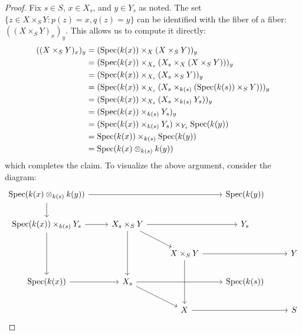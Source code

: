 \begin{proof}
	Fix $s \in S$, $x \in X_s$, and $y \in Y_s$ as noted. The set $\{ z \in X \times_S Y : p(z) = x, q(z) = y\}$ can be identified with the fiber of a fiber: $((X \times_S Y)_x)_y$. This allows us to compute it directly:
	\begin{align*}
	((X \times_S Y)_x)_y
		&= (\operatorname{Spec}(k(x)) \times_X (X \times_S Y))_y \\
		&= (\operatorname{Spec}(k(x)) \times_{X_s} (X_s \times_X (X \times_S Y)))_y \\
		&= (\operatorname{Spec}(k(x)) \times_{X_s} (X_s \times_S Y))_y \\
		&= (\operatorname{Spec}(k(x)) \times_{X_s} (X_s \times_{k(s)} (\operatorname{Spec}(k(s)) \times_S Y)))_y \\
		&= (\operatorname{Spec}(k(x)) \times_{X_s} (X_s \times_{k(s)} Y_s))_y \\
		&= (\operatorname{Spec}(k(x)) \times_{k(s)} Y_s)_y \\
		&= (\operatorname{Spec}(k(x)) \times_{k(s)} Y_s) \times_{Y_s} \operatorname{Spec}(k(y)) \\
		&= \operatorname{Spec}(k(x)) \times_{k(s)} \operatorname{Spec}(k(y)) \\
		&= \operatorname{Spec}(k(x) \otimes_{k(s)} k(y))
	\end{align*}
	which completes the claim. To visualize the above argument, consider the diagram:
	\[ \begin{tikzcd} \Spec(k(x) \otimes_{k(s)} k(y)) \arrow[rrr] \arrow[d] & & & \Spec(k(y)) \\ \Spec(k(x)) \times_{k(s)} Y_s \arrow[r] \arrow[dd] & X_s \times_S Y \arrow[rr] \arrow[dr] \arrow[dd] & & Y_s \\ & & X \times_S Y \arrow[rr] \arrow[dd] & & Y \\ \Spec(k(x)) \arrow[r] & X_s \arrow[rr] \arrow[dr] & & \Spec(k(s)) \\ & & X \arrow[rr] & & S \end{tikzcd} \]
\end{proof}
